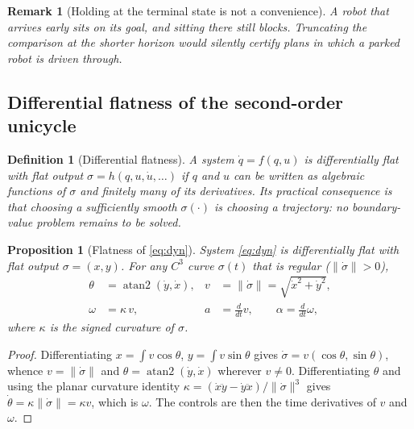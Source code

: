 \documentclass[conference]{IEEEtran}
\newtheorem{definition}{Definition}
\newtheorem{proposition}{Proposition}
\newtheorem{remark}{Remark}
\begin{document}
\begin{remark}[Holding at the terminal state is not a convenience]
A robot that arrives early sits on its goal, and sitting there still blocks. Truncating the
comparison at the shorter horizon would silently certify plans in which a parked robot is
driven through.
\end{remark}

\subsection{Differential flatness of the second-order unicycle}
\label{sec:prelim-flat}

\begin{definition}[Differential flatness]
A system $\dot q = f(q,u)$ is \emph{differentially flat} with flat output
$\sigma = h(q,u,\dot u,\dots)$ if $q$ and $u$ can be written as algebraic functions of
$\sigma$ and finitely many of its derivatives. Its practical consequence is that choosing a
sufficiently smooth $\sigma(\cdot)$ \emph{is} choosing a trajectory: no boundary-value
problem remains to be solved.
\end{definition}

\begin{proposition}[Flatness of \eqref{eq:dyn}]
\label{prop:flat}
System \eqref{eq:dyn} is differentially flat with flat output $\sigma = (x,y)$. For any
$C^3$ curve $\sigma(t)$ that is regular ($\lVert\dot\sigma\rVert > 0$),
\begin{equation}
\begin{aligned}
  \theta &= \operatorname{atan2}(\dot y, \dot x), &
  v &= \lVert\dot\sigma\rVert = \sqrt{\dot x^2 + \dot y^2},\\
  \omega &= \kappa\, v, &
  a &= \tfrac{d}{dt} v, \qquad \alpha = \tfrac{d}{dt}\omega,
\end{aligned}
\label{eq:flatmap}
\end{equation}
where $\kappa$ is the signed curvature of $\sigma$.
\end{proposition}

\begin{proof}
Differentiating $x = \int v\cos\theta$, $y = \int v\sin\theta$ gives
$\dot\sigma = v(\cos\theta,\sin\theta)$, whence $v = \lVert\dot\sigma\rVert$ and
$\theta = \operatorname{atan2}(\dot y,\dot x)$ wherever $v \neq 0$. Differentiating
$\theta$ and using the planar curvature identity
$\kappa = (\dot x\ddot y - \dot y\ddot x)/\lVert\dot\sigma\rVert^3$ gives
$\dot\theta = \kappa\lVert\dot\sigma\rVert = \kappa v$, which is $\omega$. The controls are
then the time derivatives of $v$ and $\omega$.
\end{proof}
\end{document}
